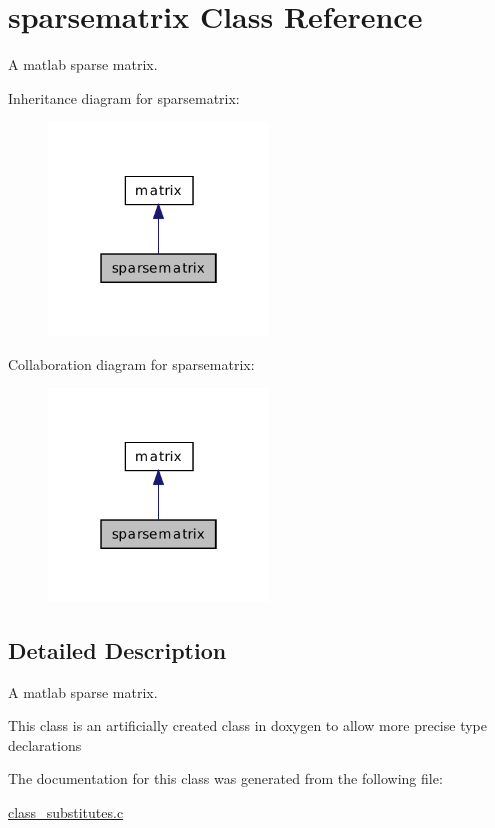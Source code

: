 \hypertarget{classsparsematrix}{\section{sparsematrix Class Reference}
\label{classsparsematrix}
}


A matlab sparse matrix.  




Inheritance diagram for sparsematrix\-:\nopagebreak
\begin{figure}[H]
\begin{center}
\leavevmode
\includegraphics[width=166pt]{classsparsematrix__inherit__graph}
\end{center}
\end{figure}


Collaboration diagram for sparsematrix\-:\nopagebreak
\begin{figure}[H]
\begin{center}
\leavevmode
\includegraphics[width=166pt]{classsparsematrix__coll__graph}
\end{center}
\end{figure}


\subsection{Detailed Description}
A matlab sparse matrix. 

This class is an artificially created class in doxygen to allow more precise type declarations 

The documentation for this class was generated from the following file\-:\begin{DoxyCompactItemize}
\item 
\hyperlink{class__substitutes_8c}{class\-\_\-substitutes.\-c}\end{DoxyCompactItemize}
